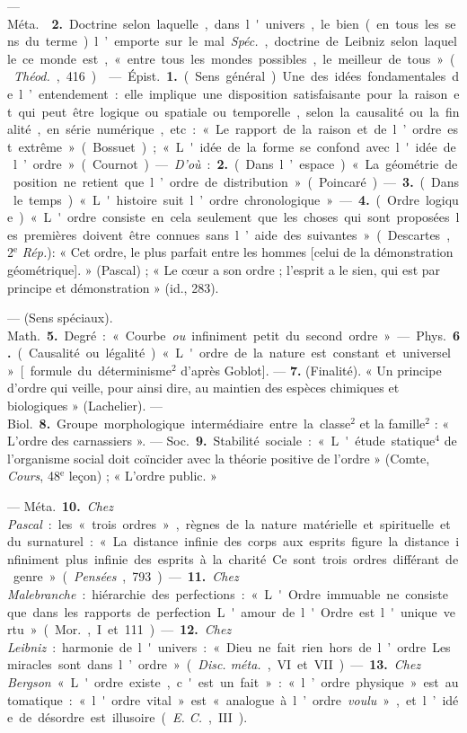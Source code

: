 \begin{itemize}[leftmargin=1cm, label=, itemsep=1pt]
— \si{Méta.}  {\bf 2.} Doctrine selon laquelle, dans
l'univers, le bien (en tous les sens du terme) l’emporte sur le mal.
{\it Spéc.}, doctrine de Leibniz selon laquelle ce monde est, « entre tous
les mondes possibles, le meilleur de tous » ({\it Théod.}, 416).

 — \si{Épist.} {\bf 1.} (Sens général). Une des idées fondamentales
de l’entendement : elle implique une disposition satisfaisante pour la raison
et qui peut être logique ou spatiale ou temporelle, selon la causalité ou la
finalité, en série numérique, etc : « Le rapport de la raison et de l’ordre
est extrême » (Bossuet) ; « L'idée de la forme se confond avec l'idée de
l’ordre » (Cournot). — {\it D'où} : {\bf 2.} (Dans l’espace). « La géométrie
de position ne retient que l’ordre de distribution » (Poincaré). — {\bf 3.}
(Dans le temps). « L'histoire suit l’ordre chronologique ». — {\bf 4.} (Ordre
logique). « L'ordre consiste en cela seulement que les choses qui sont
proposées les premières doivent être connues sans l’aide des suivantes
» (Descartes, 2$^\text{e}$ {\it Rép.}): « Cet ordre, le plus parfait entre
les hommes [celui de la démonstration géométrique]. » (Pascal) ; « Le cœur a
son ordre ; l'esprit a le sien, qui est par principe et démonstration » (id.,
283).

— (Sens spéciaux). \si{Math.} {\bf 5.} Degré : « Courbe {\it ou} infiniment
petit du second ordre ». — \si{Phys.} {\bf 6.} (Causalité ou légalité). «
L'ordre de la nature est constant et universel » [formule du déterminisme$^2$
d’après
Goblot]. — {\bf 7.} (Finalité). « Un principe d'ordre qui veille, pour ainsi
dire, au maintien des espèces chimiques et biologiques » (Lachelier). —
\si{Biol.} {\bf 8.} Groupe morphologique intermédiaire entre la classe$^2$ et
la famille$^2$ : « L'ordre des carnassiers ». — \si{Soc.} {\bf 9.} Stabilité
sociale : « L'étude statique$^4$ de l’organisme social doit coïncider avec la
théorie positive de l'ordre » (Comte, {\it Cours}, 48$^\text{e}$ leçon) ;
« L'ordre public. »

— \si{Méta.} {\bf 10.} {\it Chez Pascal} : les « trois ordres », règnes de la
nature matérielle et spirituelle et du surnaturel : « La distance infinie des
corps aux esprits figure la distance infiniment plus infinie des esprits à la
charité. Ce sont trois ordres différant de genre. » ({\it Pensées}, 793). —
{\bf 11.} {\it Chez Malebranche} : hiérarchie des perfections : « L'Ordre
immuable ne consiste que dans les rapports de perfection. L'amour de l'Ordre
est l'unique vertu » (\si{Mor.}, I et 111). — {\bf 12.} {\it Chez Leibniz} :
harmonie de l'univers : « Dieu ne fait rien hors de l’ordre... Les miracles
sont dans l’ordre » ({\it Disc. méta.}, VI et VII). — {\bf 13.} {\it Chez
Bergson} « L'ordre existe, c'est un fait » : « l’ordre physique » est
automatique: « l'ordre vital » est « analogue à l’ordre {\it voulu} », et
l’idée de désordre est illusoire ({\it E. C.}, III).


\end{itemize}
